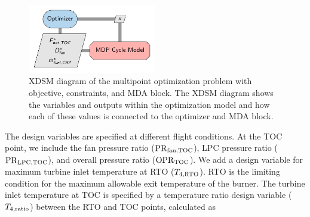 \documentclass[conf]{new-aiaa}
\begin{document}
\begin{figure}[!hbt]
  \centering
  \includegraphics[width=0.5\textwidth]{N3_opt_XDSM.pdf}
  \caption{
    XDSM diagram of the multipoint optimization problem with objective, constraints, and MDA block.
    The XDSM diagram shows the variables and outputs within the optimization model and how each of these values is connected to the optimizer and MDA block.}
  \label{fig:N3_opt_xdsm}
\end{figure}


The design variables are specified at different flight conditions.
At the TOC point, we include the fan pressure ratio ($\rm{PR}_{\rm{fan,TOC}}$), LPC pressure ratio ($\rm{PR}_{\rm{LPC,TOC}}$), and overall pressure ratio ($\rm{OPR}_{\rm{TOC}}$).
We add a design variable for maximum turbine inlet temperature at RTO ($T_{4,\rm{RTO}}$).
RTO is the limiting condition for the maximum allowable exit temperature of the burner.
The turbine inlet temperature at TOC is specified by a temperature ratio design variable ($T_{4,\rm{ratio}}$) between the RTO and TOC points, calculated as
\end{document}

